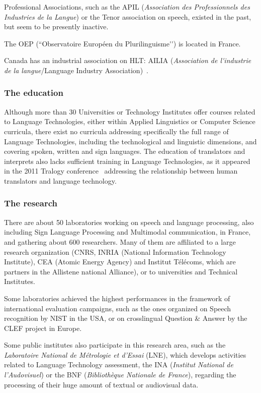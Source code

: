 \begin{multicols}{2}
Professional Associations, such as the APIL ({\em Association des
Professionnels des Industries de la Langue}) or the Tenor association
on speech, existed in the past, but seem to be presently inactive.

The OEP (``Observatoire Européen du Plurilinguisme{\mbox '}{\mbox '}) is located in France\cite{OEP}.

Canada has an industrial association on HLT: AILIA ({\em Association de
l{\mbox '}industrie de la langue}/Language Industry Association)~\cite{ailia}.

\subsubsection{The education}

Although more than 30 Universities or Technology Institutes offer
courses related to Language Technologies, either within Applied
Linguistics or Computer Science curricula, there exist no curricula
addressing specifically the full range of Language Technologies,
including the technological and linguistic dimensions, and covering
spoken, written and sign languages. The education of translators and
interprets also lacks sufficient training in Language Technologies, as
it appeared in the 2011 Tralogy conference~\cite{tralogy} addressing the
relationship between human translators and language technology.

\subsubsection{The research}

There are about 50 laboratories working on speech and language
processing, also including Sign Language Processing and Multimodal
communication, in France, and gathering about 600 researchers. Many of
them are affiliated to a large research organization (CNRS, INRIA
(National Information Technology Institute), CEA (Atomic Energy
Agency) and Institut Télécoms, which are partners in the Allistene
national Alliance), or to universities and Technical Institutes.

Some laboratories achieved the highest performances in the framework
of international evaluation campaigns, such as the ones organized on
Speech recognition by NIST in the USA, or on crosslingual
Question \& Answer by the CLEF project in Europe.

Some public institutes also participate in this research area, such as
the {\em Laboratoire National de Métrologie et d’Essai} (LNE), which
develops activities related to Language Technology assessment, the INA
({\em Institut National de l’Audovisuel}) or the BNF ({\em Bibliothèque Nationale
de France}), regarding the processing of their huge amount of textual
or audiovisual data.


\end{multicols}
